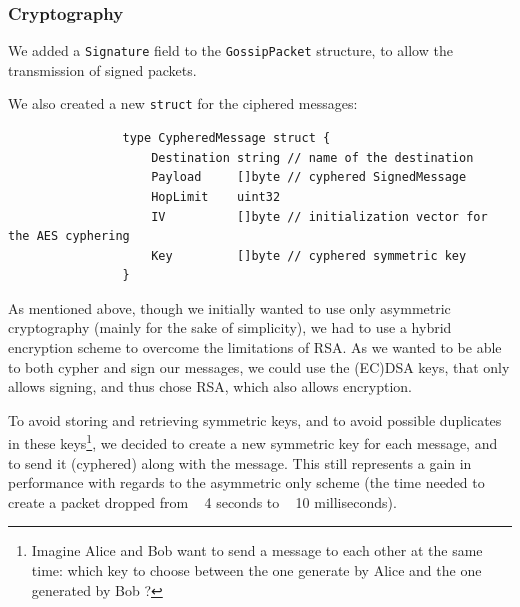 \documentclass[11pt, a4paper]{article}
\begin{document}


        \subsubsection{Cryptography}

        We added a \texttt{Signature} field to the \texttt{GossipPacket} structure, to allow the transmission of signed packets.

        We also created a new \texttt{struct} for the ciphered messages:
            \begin{lstlisting}
                type CypheredMessage struct {
                    Destination string // name of the destination
                    Payload     []byte // cyphered SignedMessage
                    HopLimit    uint32
                    IV          []byte // initialization vector for the AES cyphering
                    Key         []byte // cyphered symmetric key
                }
            \end{lstlisting}

            As mentioned above, though we initially wanted to use only asymmetric cryptography (mainly for the sake of simplicity), we had to use a hybrid encryption scheme to overcome the limitations of RSA. As we wanted to be able to both cypher and sign our messages, we could use the (EC)DSA keys, that only allows signing, and thus chose RSA, which also allows encryption.

            To avoid storing and retrieving symmetric keys, and to avoid possible duplicates in these keys\footnote{Imagine Alice and Bob want to send a message to each other at the same time: which key to choose between the one generate by Alice and the one generated by Bob ?}, we decided to create a new symmetric key for each message, and to send it (cyphered) along with the message. This still represents a gain in performance with regards to the asymmetric only scheme (the time needed to create a packet dropped from ~ 4 seconds to ~ 10 milliseconds).
\end{document}
